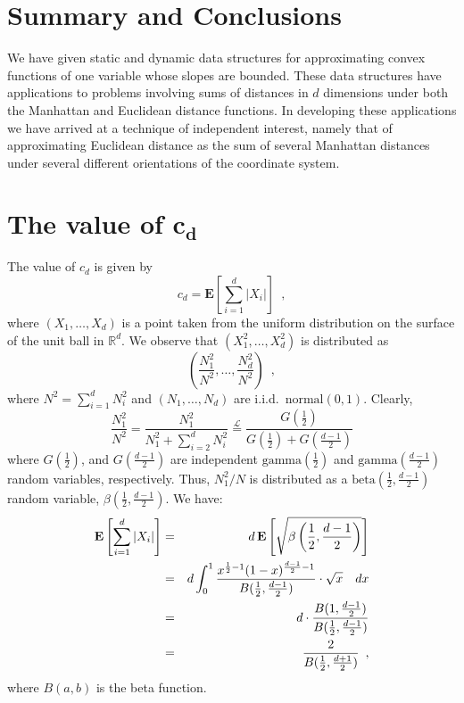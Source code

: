 \documentclass[charterfonts,lotsofwhite]{patmorin}
\newcommand{\E}{\mathbf{E}}
\begin{document}
\section{Summary and Conclusions}

We have given static and dynamic data structures for approximating
convex functions of one variable whose slopes are bounded.  These data
structures have applications to problems involving sums of distances
in $d$ dimensions under both the Manhattan and Euclidean distance
functions.  In developing these applications we have arrived at a
technique of independent interest, namely that of approximating
Euclidean distance as the sum of several Manhattan distances under
several different orientations of the coordinate system.





\appendix
\section{The value of $\mathbf{c_d}$}

The value of $c_d$ is given by
\[
  c_d = \E \left[\sum_{i=1}^d|X_i| \right] \enspace ,
\]
where $(X_1,\ldots,X_d)$ is a point taken from the uniform
distribution on the surface of the unit ball in $\mathbb{R}^d$.
We observe that $(X_1^2,\ldots,X_d^2)$ is distributed as 
\[
\left(\frac{N_1^2}{N^2},\ldots,\frac{N_d^2}{N^2}\right) \enspace ,
\]
where $N^2=\sum_{i=1}^d N_i^2$ and $(N_1,\ldots,N_d)$ are i.i.d.\
$\mathrm{normal}(0,1)$.  Clearly,
\[
\frac{N_1^2}{N^2} = \frac{N_1^2}{N_1^2+\sum_{i=2}^dN_i^2}
  \stackrel{\mathcal{L}}{=} \frac{G(\frac{1}{2})}{G(\frac{1}{2})+G(\frac{d-1}{2})}
\]
where $G(\frac{1}{2})$, and $G(\frac{d-1}{2})$ are independent
$\mathrm{gamma}(\frac{1}{2})$ and $\mathrm{gamma}(\frac{d-1}{2})$
random variables, respectively.  Thus, $N_1^2/N$ is distributed as a
$\mathrm{beta}(\frac{1}{2},\frac{d-1}{2})$ random variable,
$\beta(\frac{1}{2},\frac{d-1}{2})$.  We have:
\begin{eqnarray*}
\E\left[\sum_{i=1}^d |X_i|\right]
 & = & d\,\E\left[\sqrt{\beta\left(\frac{1}{2},\frac{d-1}{2}\right)}\right] \\
 & = & d\int_0^1\frac{x^{\frac{1}{2}-1}(1-x)^{\frac{d-1}{2}-1}}
                    {B(\frac{1}{2},\frac{d-1}{2})}\cdot\sqrt{x} \quad dx\\
 & = & d\cdot\frac{B(1,\frac{d-1}{2})}{B(\frac{1}{2},\frac{d-1}{2})}\\
\comment{ & = & d\cdot 
       \frac{\Gamma(\frac{d-1}{2})}
            {\Gamma(\frac{d+1}{2})} \cdot
       \frac{\Gamma(\frac{d}{2})}
            {\Gamma(\frac{1}{2})\cdot\Gamma(\frac{d-1}{2})} \\
 & = & \frac{d\Gamma(\frac{d}{2})}
            {\Gamma(\frac{1}{2})\cdot\Gamma(\frac{d+1}{2})} \\ 
 & = & \frac{2\Gamma(\frac{d}{2}+1)}
            {\Gamma(\frac{1}{2})\cdot\Gamma(\frac{d+1}{2})} \\
}
 & = & \frac{2}{B(\frac{1}{2},\frac{d+1}{2})} \enspace , 
\end{eqnarray*}
where $B(a,b)$ is the beta function.
\end{document}
